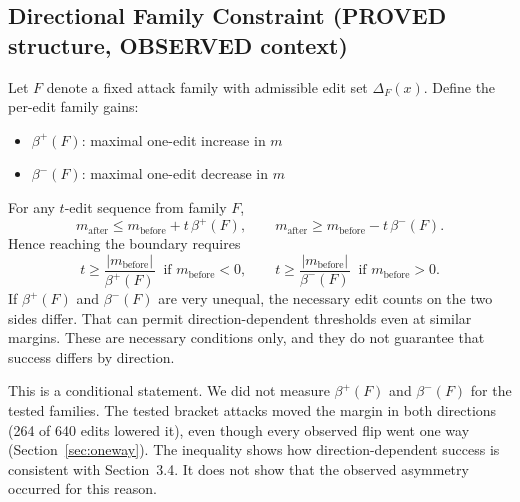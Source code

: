 \documentclass[11pt]{article}
\newcommand{\lab}[1]{{\footnotesize\MakeUppercase{#1}}}
\newcommand{\proved}{\lab{proved}}
\newcommand{\observed}{\lab{observed}}
\begin{document}
\subsection{Directional Family Constraint (\proved{} structure, \observed{} context)}\label{sec:directional}
Let $F$ denote a fixed attack family with admissible edit set $\Delta_F(x)$. Define the per-edit family gains:
\begin{itemize}
  \item $\beta^{+}(F)$: maximal one-edit increase in $m$
  \item $\beta^{-}(F)$: maximal one-edit decrease in $m$
\end{itemize}
For any $t$-edit sequence from family $F$,
\[
m_{\mathrm{after}} \le m_{\mathrm{before}} + t\,\beta^{+}(F), \qquad m_{\mathrm{after}} \ge m_{\mathrm{before}} - t\,\beta^{-}(F).
\]
Hence reaching the boundary requires
\[
t \ge \frac{|m_{\mathrm{before}}|}{\beta^{+}(F)} \ \text{ if } m_{\mathrm{before}} < 0, \qquad t \ge \frac{|m_{\mathrm{before}}|}{\beta^{-}(F)} \ \text{ if } m_{\mathrm{before}} > 0.
\]
If $\beta^{+}(F)$ and $\beta^{-}(F)$ are very unequal, the necessary edit counts on the two sides differ. That can permit direction-dependent thresholds even at similar margins. These are necessary conditions only, and they do not guarantee that success differs by direction.

This is a conditional statement. We did not measure $\beta^{+}(F)$ and $\beta^{-}(F)$ for the tested families. The tested bracket attacks moved the margin in both directions (264 of 640 edits lowered it), even though every observed flip went one way (Section~\ref{sec:oneway}). The inequality shows how direction-dependent success is consistent with Section~3.4. It does not show that the observed asymmetry occurred for this reason.
\end{document}
